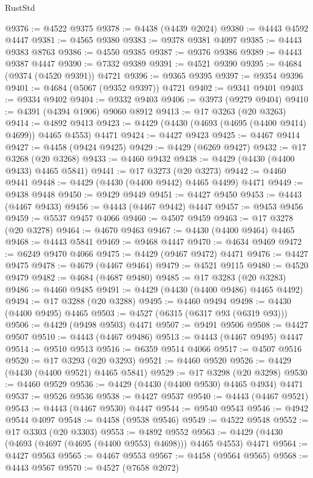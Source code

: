 \begin{lexlean}{RustStd}
\begin{coremodule}
{\begin{coremodule}
{{{{{{{{{{{{{{{{{{{{{{{{{{{{{{{{{{{{{{{{{{{{{{{{{{{{{{{{{{{{{{{{{{{{@9376 := @4522 @9375
@9378 := @4438 (@4439 @2024)
@9380 := @4443 @4592 @4447
@9381 := @4565 @9380
@9383 := @9378 @9381 @4097
@9385 := @4443 @9383 @8763
@9386 := @4550 @9385
@9387 := @9376 @9386
@9389 := @4443 @9387 @4447
@9390 := @7332 @9389
@9391 := @4521 @9390
@9395 := @4684 (@9374 (@4520 @9391)) @4721
@9396 := @9365 @9395
@9397 := @9354 @9396
@9401 := @4684 (@5067 (@9352 @9397)) @4721
@9402 := @9341 @9401
@9403 := @9334 @9402
@9404 := @9332 @9403
@9406 := @3973 (@9279 @9404)
@9410 := @4391 (@4394 @1906) @9060 @8912
@9413 := @17 @3263 (@20 @3263)
@9414 := @4892 @9413
@9423 := @4429 (@4430 (@4693 (@4695 (@4400 @9414) @4699)) @4465 @4553) @4471
@9424 := @4427 @9423
@9425 := @4467 @9414
@9427 := @4458 (@9424 @9425)
@9429 := @4429 (@6269 @9427)
@9432 := @17 @3268 (@20 @3268)
@9433 := @4460 @9432
@9438 := @4429 (@4430 (@4400 @9433) @4465 @5841)
@9441 := @17 @3273 (@20 @3273)
@9442 := @4460 @9441
@9448 := @4429 (@4430 (@4400 @9442) @4465 @4499) @4471
@9449 := @9438 @9448
@9450 := @9429 @9449
@9451 := @4427 @9450
@9453 := @4443 (@4467 @9433)
@9456 := @4443 (@4467 @9442) @4447
@9457 := @9453 @9456
@9459 := @5537 @9457 @4066
@9460 := @4507 @9459
@9463 := @17 @3278 (@20 @3278)
@9464 := @4670 @9463
@9467 := @4430 (@4400 @9464) @4465
@9468 := @4443 @5841
@9469 := @9468 @4447
@9470 := @4634 @9469
@9472 := @6249 @9470 @4066
@9475 := @4429 (@9467 @9472) @4471
@9476 := @4427 @9475
@9478 := @4679 (@4467 @9464)
@9479 := @4521 @9115
@9480 := @4520 @9479
@9482 := @4684 (@4687 @9480)
@9485 := @17 @3283 (@20 @3283)
@9486 := @4460 @9485
@9491 := @4429 (@4430 (@4400 @9486) @4465 @4492)
@9494 := @17 @3288 (@20 @3288)
@9495 := @4460 @9494
@9498 := @4430 (@4400 @9495) @4465
@9503 := @4527 (@6315 (@6317 @93 (@6319 @93)))
@9506 := @4429 (@9498 @9503) @4471
@9507 := @9491 @9506
@9508 := @4427 @9507
@9510 := @4443 (@4467 @9486)
@9513 := @4443 (@4467 @9495) @4447
@9514 := @9510 @9513
@9516 := @6359 @9514 @4066
@9517 := @4507 @9516
@9520 := @17 @3293 (@20 @3293)
@9521 := @4460 @9520
@9526 := @4429 (@4430 (@4400 @9521) @4465 @5841)
@9529 := @17 @3298 (@20 @3298)
@9530 := @4460 @9529
@9536 := @4429 (@4430 (@4400 @9530) @4465 @4934) @4471
@9537 := @9526 @9536
@9538 := @4427 @9537
@9540 := @4443 (@4467 @9521)
@9543 := @4443 (@4467 @9530) @4447
@9544 := @9540 @9543
@9546 := @4942 @9544 @4097
@9548 := @4458 (@9538 @9546)
@9549 := @4522 @9548
@9552 := @17 @3303 (@20 @3303)
@9553 := @4892 @9552
@9563 := @4429 (@4430 (@4693 (@4697 (@4695 (@4400 @9553) @4698))) @4465 @4553) @4471
@9564 := @4427 @9563
@9565 := @4467 @9553
@9567 := @4458 (@9564 @9565)
@9568 := @4443 @9567
@9570 := @4527 (@7658 @2072)
}}}}}}}}}}}}}}}}}}}}}}}}}}}}}}}}}}}}}}}}}}}}}}}}}}}}}}}}}}}}}}}}}}}}
\end{coremodule}}
\end{coremodule}
\end{lexlean}
